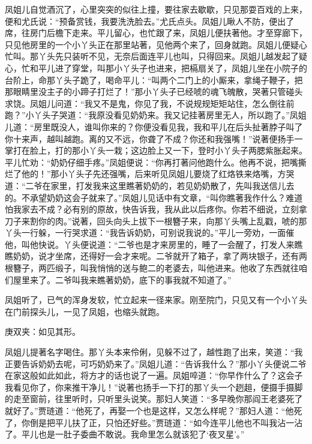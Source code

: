 \begin{parag}
    凤姐儿自觉酒沉了，心里突突的似往上撞，要往家去歇歇，只见那耍百戏的上来，便和尤氏说：“预备赏钱，我要洗洗脸去。”尤氏点头。凤姐儿瞅人不防，便出了席，往房门后檐下走来。平儿留心，也忙跟了来，凤姐儿便扶著他。才至穿廊下，只见他房里的一个小丫头正在那里站著，见他两个来了，回身就跑。凤姐儿便疑心忙叫。那丫头先只装听不见，无奈后面连平儿也叫，只得回来。凤姐儿越发起了疑心，忙和平儿进了穿堂，叫那小丫头子也进来，把槅扇关了，凤姐儿坐在小院子的台阶上，命那丫头子跪了，喝命平儿：“叫两个二门上的小厮来，拿绳子鞭子，把那眼睛里没主子的小蹄子打烂了！”那小丫头子已经唬的魂飞魄散，哭著只管碰头求饶。凤姐儿问道：“我又不是鬼，你见了我，不说规规矩矩站住，怎么倒往前跑？”小丫头子哭道：“我原没看见奶奶来。我又记挂著房里无人，所以跑了。”凤姐儿道：“房里既没人，谁叫你来的？你便没看见我，我和平儿在后头扯著脖子叫了你十来声，越叫越跑。离的又不远，你聋了不成？你还和我强嘴！”说著便扬手一掌打在脸上，打的那小丫头一栽；这边脸上又一下，登时小丫头子两腮紫胀起来。平儿忙劝：“奶奶仔细手疼。”凤姐便说：“你再打著问他跑什么。他再不说，把嘴撕烂了他的！”那小丫头子先还强嘴，后来听见凤姐儿要烧了红烙铁来烙嘴，方哭道：“二爷在家里，打发我来这里瞧著奶奶的，若见奶奶散了，先叫我送信儿去的。不承望奶奶这会子就来了。”凤姐儿见话中有文章，“叫你瞧著我作什么？难道怕我家去不成？必有别的原故，快告诉我，我从此以后疼你。你若不细说，立刻拿刀子来割你的肉。”说著，回头向头上拔下一根簪子来，向那丫头嘴上乱戳，唬的那丫头一行躲，一行哭求道：“我告诉奶奶，可别说我说的。”平儿一旁劝，一面催他，叫他快说。丫头便说道：“二爷也是才来房里的，睡了一会醒了，打发人来瞧瞧奶奶，说才坐席，还得好一会才来呢。二爷就开了箱子，拿了两块银子，还有两根簪子，两匹缎子，叫我悄悄的送与鲍二的老婆去，叫他进来。他收了东西就往咱们屋里来了。二爷叫我来瞧著奶奶，底下的事我就不知道了。”
\end{parag}


\begin{parag}
    凤姐听了，已气的浑身发软，忙立起来一径来家。刚至院门，只见又有一个小丫头在门前探头儿，一见了凤姐，也缩头就跑。\begin{note}庚双夹：如见其形。\end{note}凤姐儿提著名字喝住。那丫头本来伶俐，见躲不过了，越性跑了出来，笑道：“我正要告诉奶奶去呢，可巧奶奶来了。”凤姐儿道：“告诉我什么？”那小丫头便说二爷在家这般如此如此，将方才的话也说了一遍。凤姐啐道：“你早作什么了？这会子我看见你了，你来推干净儿！”说著也扬手一下打的那丫头一个趔趄，便摄手摄脚的走至窗前，往里听时，只听里头说笑。那妇人笑道：“多早晚你那阎王老婆死了就好了。”贾琏道：“他死了，再娶一个也是这样，又怎么样呢？”那妇人道：“他死了，你倒是把平儿扶了正，只怕还好些。”贾琏道：“如今连平儿他也不叫我沾一沾了。平儿也是一肚子委曲不敢说。我命里怎么就该犯了‘夜叉星’。”
\end{parag}



